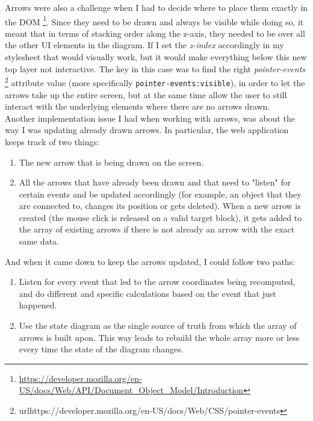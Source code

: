 \documentclass[]{usiinfbachelorproject}
\begin{document}
\noindent Arrows were also a challenge when I had to decide where to place them exactly in the DOM \footnote{\url{https://developer.mozilla.org/en-US/docs/Web/API/Document_Object_Model/Introduction}}. Since they need to be drawn and always be visible while doing so, it meant that in terms of stacking order along the z-axis, they needed to be over all the other UI elements in the diagram. If I set the \emph{z-index} accordingly in my stylesheet that would visually work, but it would make everything below this new top layer not interactive. The key in this case was to find the right \emph{pointer-events} \footnote{url{https://developer.mozilla.org/en-US/docs/Web/CSS/pointer-events}} attribute value (more specifically \texttt{pointer-events:visible}), in order to let the arrows take up the entire screen, but at the same time allow the user to still interact with the underlying elements where there are no arrows drawn.\\

\noindent Another implementation issue I had when working with arrows, was about the way I was updating already drawn arrows. In particular, the web application keeps track of two things:

\begin{enumerate}
	\item The new arrow that is being drawn on the screen.
	\item All the arrows that have already been drawn and that need to "listen" for certain events and be updated accordingly (for example, an object that they are connected to, changes its position or gets deleted). When a new arrow is created (the mouse click is released on a valid target block), it gets added to the array of existing arrows if there is not already an arrow with the exact same data. 
\end{enumerate}

\noindent And when it came down to keep the arrows updated, I could follow two paths:

\begin{enumerate}
	\item Listen for every event that led to the arrow coordinates being recomputed, and do different and specific calculations based on the event that just happened.
	\item Use the state diagram as the single source of truth from which the array of arrows is built upon. This way leads to rebuild the whole array more or less every time the state of the diagram changes.
\end{enumerate}
\end{document}
